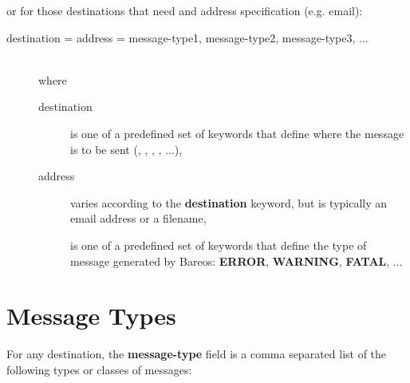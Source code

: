or for those destinations that need and address specification (e.g. email):

\begin{description}

\item [destination = address = message-type1, message-type2, message-type3, ...] \hfill \\

where

\begin{description}
    \item [destination] is one of a predefined set of keywords that define
where the message is to be sent (, , , , ...), 
    \item [address] varies according to the {\bf destination} keyword, but
is typically an email address or a filename,
    \item [] is one of a predefined set of keywords that define the type of
message generated by Bareos: {\bf ERROR}, {\bf WARNING}, {\bf FATAL},
...
\end{description}

\end{description}





\section{Message Types}
\label{MessageTypes}

For any destination, the {\bf message-type} field is a comma separated
list of the following types or classes of messages:

